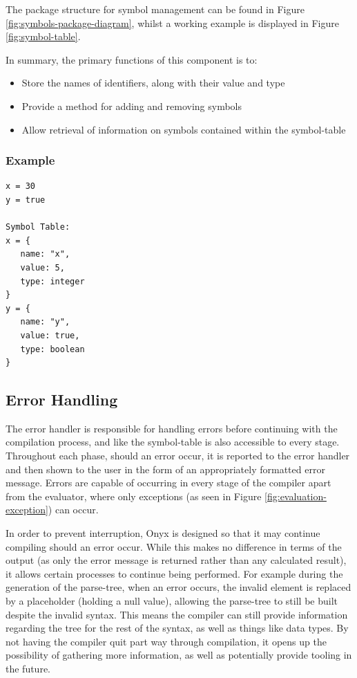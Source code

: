 \documentclass[
]{report}
\begin{document}
The package structure for symbol management can be found in Figure \ref{fig:symbols-package-diagram},
whilst a working example is displayed in Figure \ref{fig:symbol-table}.

In summary, the primary functions of this component is to: 
\begin{itemize}
	\item Store the names of \glspl{identifier}, along with their value and type
	\item Provide a method for adding and removing \glspl{symbol}
	\item Allow retrieval of information on \glspl{symbol} contained within the \gls{symbol-table}
\end{itemize}

\subsubsection{Example}
\begin{verbatim}
x = 30
y = true

Symbol Table:
x = {
   name: "x",
   value: 5,
   type: integer
}
y = {
   name: "y",
   value: true,
   type: boolean
}
\end{verbatim}

\subsection{Error Handling}
The error handler is responsible for handling errors before continuing
with the compilation process, and like the \gls{symbol-table} is also
accessible to every stage. Throughout each phase, should an error occur,
it is reported to the error handler and then shown to the user in the form
of an appropriately formatted error message. Errors are capable of
occurring in every stage of the compiler apart from the evaluator,
where only exceptions (as seen in Figure \ref{fig:evaluation-exception}) can occur.

In order to prevent interruption, Onyx is designed so that it may
continue compiling should an error occur. While this makes no difference in terms
of the output (as only the error message is returned rather than any
calculated result), it allows certain processes to continue being
performed. For example during the generation of the \gls{parse-tree}, when an
error occurs, the invalid element is replaced by a placeholder (holding a
null value), allowing the \gls{parse-tree} to still be built despite the
invalid syntax. This means the compiler can still provide information
regarding the tree for the rest of the syntax, as well as things like
data types. By not having the compiler quit part way through
compilation, it opens up the possibility of gathering more information, as
well as potentially provide tooling in the future.
\end{document}
